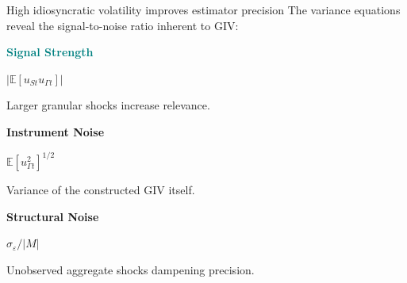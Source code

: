 \documentclass[aspectratio=169,11pt]{beamer}
\begin{document}
\begin{frame}{High idiosyncratic volatility improves estimator precision}
    \vspace{0.5cm}
    \centering
    The variance equations reveal the signal-to-noise ratio inherent to GIV:
    
    \vspace{0.8cm}
    \begin{minipage}{0.3\textwidth}
        \centering
        \textcolor{Teal}{\textbf{Signal Strength}}
        
        \vspace{0.2cm}
        $|\mathbb{E}[u_{St} u_{\Gamma t}]|$
        
        \vspace{0.2cm}
        Larger granular shocks increase relevance.
    \end{minipage}
    \hfill
    \begin{minipage}{0.3\textwidth}
        \centering
        \textcolor{WarmOrange}{\textbf{Instrument Noise}}
        
        \vspace{0.2cm}
        $\mathbb{E}[u_{\Gamma t}^2]^{1/2}$
        
        \vspace{0.2cm}
        Variance of the constructed GIV itself.
    \end{minipage}
    \hfill
    \begin{minipage}{0.3\textwidth}
        \centering
        \textcolor{SoftPurple}{\textbf{Structural Noise}}
        
        \vspace{0.2cm}
        $\sigma_{\varepsilon} / |M|$
        
        \vspace{0.2cm}
        Unobserved aggregate shocks dampening precision.
    \end{minipage}
\end{frame}
\end{document}

